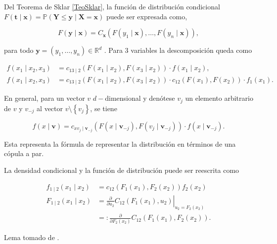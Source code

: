 Del Teorema de Sklar \ref{TeoSklar}, la función de distribución condicional $F(\mathbf{t} \mid \mathbf{x})=\mathbb{P}(\mathbf{Y} \leq \mathbf{y} \mid \mathbf{X}=\mathbf{x})$ puede ser expresada como,

\begin{equation}
    F(\mathbf{y} \mid \mathbf{x})= C_{\mathbf{x}}\left(F\left(y_{1} \mid \mathbf{x}\right), \ldots, F\left(y_{n} \mid \mathbf{x}\right)\right),
\end{equation}

 para todo $\mathbf{y}=\left(y_{1}, \ldots, y_{n}\right) \in \mathbb{R}^d$ \cite{arxiv.2403.12565}. Para $3$ variables la descomposición queda como

\begin{equation}\label{3var}
    \begin{split}
        f\left(x_1 \mid x_2, x_3\right) & = c_{13 \mid 2} (F\left(x_1 \mid x_2\right), F\left(x_3 \mid x_2\right) ) \cdot f\left(x_1 \mid x_2\right), \\
        f\left(x_1 \mid x_2, x_3\right) & = c_{13 \mid 2}(F\left(x_1 \mid x_2\right), F\left(x_3 \mid x_2\right)) \cdot c_{12}( F\left(x_1\right), F\left(x_2\right)) \cdot f_1(x_1).
    \end{split}
\end{equation}

En general, para un vector $v$ $d-$dimensional y denótese $v_j$ un elemento arbitrario de $v$ y $v_{-j}$ al vector $v \setminus \left\{ v_j \right\}$, se tiene

\begin{equation}\label{fact}
    f(x \mid \boldsymbol{v}) = c_{x v_j \mid \boldsymbol{v}_{-j}} (  F \left(x \mid \boldsymbol{v}_{-j}\right), F\left(v_j \mid \boldsymbol{v}_{-j}\right) ) \cdot f\left(x \mid \boldsymbol{v}_{-j}\right).
\end{equation}

Esta representa la fórmula de representar la distribución en términos de una cópula a par.

\begin{lema}La densidad condicional y la función de distribución puede ser reescrita como

\begin{equation}
    \begin{aligned}
    f_{1 \mid 2}\left(x_1 \mid x_2\right) & =c_{12}\left(F_1\left(x_1\right), F_2\left(x_2\right)\right) f_2\left(x_2\right) \\
    F_{1 \mid 2}\left(x_1 \mid x_2\right) & =\left.\frac{\partial}{\partial u_2} C_{12}\left(F_1\left(x_1\right), u_2\right)\right|_{u_2=F_2\left(x_2\right)} \\
    & =: \frac{\partial}{\partial F_2\left(x_2\right)} C_{12}\left(F_1\left(x_1\right), F_2\left(x_2\right)\right) .
    \end{aligned}
\end{equation}

Lema tomado de \cite[pag 20]{czadoAnalyzing}.
\end{lema}


